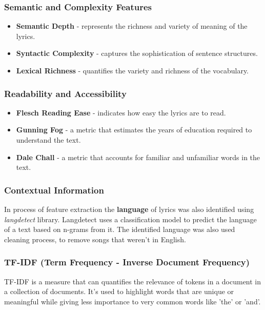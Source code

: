\subsubsection*{Semantic and Complexity Features}
\begin{itemize}
  \item \textbf{Semantic Depth} - represents the richness and variety of
    meaning of the lyrics.
  \item \textbf{Syntactic Complexity} - captures the sophistication of
    sentence structures.
  \item \textbf{Lexical Richness} - quantifies the variety and richness of the
    vocabulary.
\end{itemize}



\subsubsection*{Readability and Accessibility}
\begin{itemize}
  \item \textbf{Flesch Reading Ease} - indicates how easy the lyrics are to
    read.
  \item \textbf{Gunning Fog} - a metric that estimates the  years of education
    required to understand the text.
  \item \textbf{Dale Chall} - a metric that accounts for familiar and
    unfamiliar words in the text.
\end{itemize}


\subsubsection*{Contextual Information}
  In process of feature extraction the \textbf{language} of lyrics was also
  identified using \textit{langdetect} library. Langdetect uses a
  classification model to predict the language of a text based on n-grams from
  it. The identified language was also used cleaning process, to remove songs
  that weren't in English.

\subsubsection*{TF-IDF (Term Frequency - Inverse Document Frequency)}

TF-IDF is a measure that can quantifies the relevance of tokens in a
document in a collection of documents. It's used to highlight words that are unique or
meaningful while giving less importance to very common words like 'the' or
'and'.\cite{tfidf}

